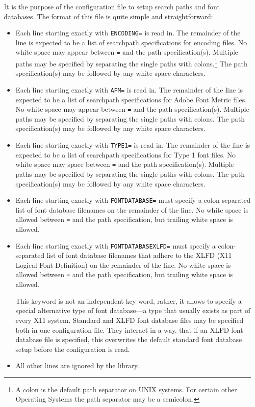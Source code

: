 It is the purpose of the configuration file to setup search paths and font
databases. The format of this file is quite simple and straightforward:
\begin{itemize}
\item Each line starting exactly with \verb+ENCODING=+ is read in. The
  remainder of the line is expected to be a list of searchpath
  specifications for encoding files. No white space may appear
  between \verb+=+ and the path specification(s).
  Multiple paths may be specified by separating
  the single paths with colons.\footnote{A colon is the default path separator
    on UNIX systems. For certain other Operating Systems the path separator
    may be a semicolon.} The path specification(s) may be
  followed by any white space characters.
\item Each line starting exactly with \verb+AFM=+ is read in. The
  remainder of the line is expected to be a list of searchpath
  specifications for Adobe Font Metric files. No white space may
  appear between \verb+=+ and the path specification(s). 
  Multiple paths may be specified by separating 
  the single paths with colons. The path specification(s) may be
  followed by any white space characters.
\item Each line starting exactly with \verb+TYPE1=+ is read in. The
  remainder of the line is expected to be a list of searchpath
  specifications for Type 1 font files. No white space may
  space between \verb+=+ and the path specification(s). 
  Multiple paths may be specified by separating
  the single paths with colons. The path specification(s) may be
  followed by any white space characters.
\item Each line starting exactly with \verb+FONTDATABASE=+ must specify a
  colon-separated list of font database filenames on the remainder of the
  line. No white space is allowed between \verb+=+ and the path specification,
  but trailing white space is allowed.
\item Each line starting exactly with \verb+FONTDATABASEXLFD=+ must specify a
  colon-separated list of font database filenames that adhere to the XLFD (X11
  Logical Font Definition) on the remainder of the line. No white space is
  allowed between \verb+=+ and the path specification, but trailing white
  space is allowed.
  
  This keyword is not an independent key word, rather, it allows to specify a
  special alternative type of font database---a type that usually exists as
  part of every X11 system. Standard and XLFD font database files may be
  specified both in one configuration file. They interact in a way, that if an
  XLFD font database file is specified, this overwrites the default standard
  font database setup before the configuration is read.
\item All other lines are ignored by the library. 
\end{itemize}

